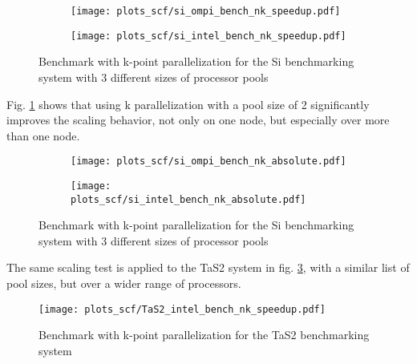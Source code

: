 \documentclass[main.tex]{subfiles}
\begin{document}
\begin{figure}[ht!]
\begin{subfigure}[b]{0.49\textwidth}
    \centering
    \texttt{[image: plots\_scf/si\_ompi\_bench\_nk\_speedup.pdf]}
\end{subfigure}
\begin{subfigure}[b]{0.49\textwidth}
    \centering
    \texttt{[image: plots\_scf/si\_intel\_bench\_nk\_speedup.pdf]}
\end{subfigure}
\caption{Benchmark with k-point parallelization for the Si benchmarking system with 3 different sizes of processor pools}
\label{fig:scaling_scf_nk_si}
\end{figure}

Fig. \ref{fig:scaling_scf_nk_si} shows that using k parallelization with a pool size of 2 significantly improves the scaling behavior, not only on one node, but especially over more than one node.



\begin{figure}[ht!]
\begin{subfigure}[b]{0.49\textwidth}
    \centering
    \texttt{[image: plots\_scf/si\_ompi\_bench\_nk\_absolute.pdf]}
\end{subfigure}
\begin{subfigure}[b]{0.49\textwidth}
    \centering
    \texttt{[image: plots\_scf/si\_intel\_bench\_nk\_absolute.pdf]}
\end{subfigure}
\caption{Benchmark with k-point parallelization for the Si benchmarking system with 3 different sizes of processor pools}
\label{fig:scaling_scf_nk_si_absolute}
\end{figure}


The same scaling test is applied to the TaS2 system in fig. \ref{fig:scaling_scf_nk_tas2}, with a similar list of pool sizes, but over a wider range of processors.

\begin{figure}[ht!]
    \centering
    \texttt{[image: plots\_scf/TaS2\_intel\_bench\_nk\_speedup.pdf]}
    \caption{Benchmark with k-point parallelization for the TaS2 benchmarking system}
    \label{fig:scaling_scf_nk_tas2}
\end{figure}
\end{document}
